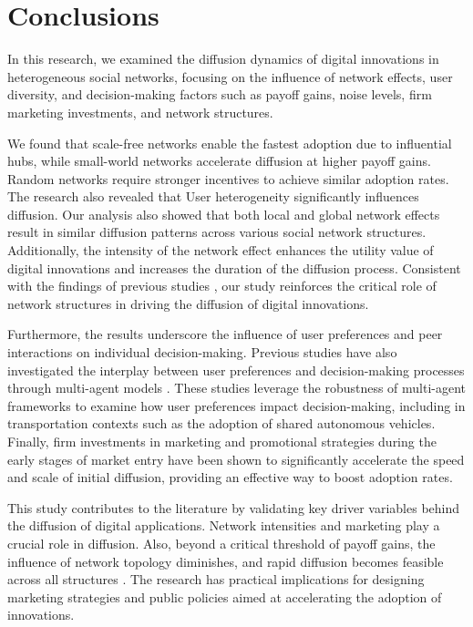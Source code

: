 \documentclass{article} %
\begin{document}
\section{Conclusions}

In this research, we examined the diffusion dynamics of digital innovations in heterogeneous social networks, focusing on the influence of network effects, user diversity, and decision-making factors such as payoff gains, noise levels, firm marketing investments, and network structures. 

We found that scale-free networks enable the fastest adoption due to influential hubs, while small-world networks accelerate diffusion at higher payoff gains. Random networks require stronger incentives to achieve similar adoption rates. The research also revealed that User heterogeneity significantly influences diffusion. Our analysis also showed that both local and global network effects result in similar diffusion patterns across various social network structures. Additionally, the intensity of the network effect enhances the utility value of digital innovations and increases the duration of the diffusion process. Consistent with the findings of previous studies \cite{wei2019social, muller_network_2019}, our study reinforces the critical role of network structures in driving the diffusion of digital innovations. 

Furthermore, the results underscore the influence of user preferences and peer interactions on individual decision-making. Previous studies have also investigated the interplay between user preferences and decision-making processes through multi-agent models \cite{kickhofer2011income, kamel2019user}. These studies leverage the robustness of multi-agent frameworks to examine how user preferences impact decision-making, including in transportation contexts such as the adoption of shared autonomous vehicles. Finally, firm investments in marketing and promotional strategies during the early stages of market entry have been shown to significantly accelerate the speed and scale of initial diffusion, providing an effective way to boost adoption rates.

This study contributes to the literature by validating key driver variables behind the diffusion of digital applications. Network intensities and marketing play a crucial role in diffusion. Also, beyond a critical threshold of payoff gains, the influence of network topology diminishes, and rapid diffusion becomes feasible across all structures \cite{kreindler2014rapid}. The research has practical implications for designing marketing strategies and public policies aimed at accelerating the adoption of innovations.
\end{document}
